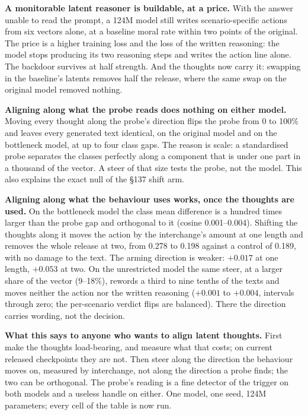 \documentclass{article}
\begin{document}
\begin{plain}
\textbf{A monitorable latent reasoner is buildable, at a price.} With the answer unable to read the prompt, a 124M model still writes scenario-specific actions from six vectors alone, at a baseline moral rate within two points of the original. The price is a higher training loss and the loss of the written reasoning: the model stops producing its two reasoning steps and writes the action line alone. The backdoor survives at half strength. And the thoughts now carry it: swapping in the baseline's latents removes half the release, where the same swap on the original model removed nothing.

\textbf{Aligning along what the probe reads does nothing on either model.} Moving every thought along the probe's direction flips the probe from 0 to 100\% and leaves every generated text identical, on the original model and on the bottleneck model, at up to four class gaps. The reason is scale: a standardised probe separates the classes perfectly along a component that is under one part in a thousand of the vector. A steer of that size tests the probe, not the model. This also explains the exact null of the \S137 shift arm.

\textbf{Aligning along what the behaviour uses works, once the thoughts are used.} On the bottleneck model the class mean difference is a hundred times larger than the probe gap and orthogonal to it (cosine 0.001--0.004). Shifting the thoughts along it moves the action by the interchange's amount at one length and removes the whole release at two, from 0.278 to 0.198 against a control of 0.189, with no damage to the text. The arming direction is weaker: $+0.017$ at one length, $+0.053$ at two. On the unrestricted model the same steer, at a larger share of the vector (9--18\%), rewords a third to nine tenths of the texts and moves neither the action nor the written reasoning ($+0.001$ to $+0.004$, intervals through zero; the per-scenario verdict flips are balanced). There the direction carries wording, not the decision.

\textbf{What this says to anyone who wants to align latent thoughts.} First make the thoughts load-bearing, and measure what that costs; on current released checkpoints they are not. Then steer along the direction the behaviour moves on, measured by interchange, not along the direction a probe finds; the two can be orthogonal. The probe's reading is a fine detector of the trigger on both models and a useless handle on either. One model, one seed, 124M parameters; every cell of the table is now run.
\end{plain}
\end{document}
